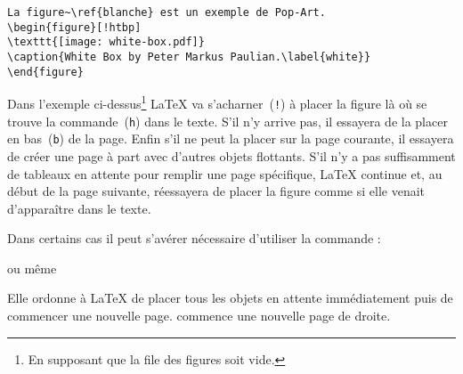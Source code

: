 \begin{code}
\begin{verbatim}
La figure~\ref{blanche} est un exemple de Pop-Art.
\begin{figure}[!htbp]
\texttt{[image: white-box.pdf]}
\caption{White Box by Peter Markus Paulian.\label{white}}
\end{figure}
\end{verbatim}
\end{code}

Dans l'exemple ci-dessus\footnote{En supposant que la file
des figures soit vide.} \LaTeX{} va s'acharner~(\texttt{!}) à
placer la figure là où se trouve la commande~(\texttt{h}) dans le
texte. S'il n'y arrive pas, il essayera de la placer en
bas~(\texttt{b}) de la page. Enfin s'il ne peut la placer sur la
page courante, il essayera de créer une page à part avec d'autres
objets flottants. S'il n'y a pas suffisamment de tableaux en attente
pour remplir une page spécifique, \LaTeX{} continue et, au début de la
page suivante, réessayera de placer la figure comme si elle venait
d'apparaître dans le texte.

Dans certains cas il peut s'avérer nécessaire d'utiliser la commande :
\begin{lscommand}
 ou même 
\end{lscommand}
Elle ordonne à \LaTeX{} de placer tous les objets en attente
immédiatement puis de commencer une nouvelle
page.  commence une nouvelle page de droite.


\endinput

